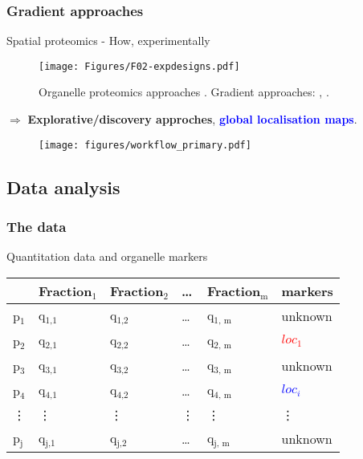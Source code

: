 \subsubsection*{Gradient approaches}
\label{sec:grad}

\begin{frame}{Spatial proteomics - How, experimentally}
  \begin{figure}
    \texttt{[image: Figures/F02-expdesigns.pdf]}
    \caption{Organelle proteomics approaches
      \citep{Gatto:2010}. Gradient approaches: \cite{Dunkley:2006},
      \cite{Foster2006}.}
  \end{figure}
  $\Rightarrow$ \textbf{Explorative/discovery approches},
  \textcolor{Blue}{\textbf{global localisation maps}}.
\end{frame}


\begin{frame}{}
  \begin{figure}
    \texttt{[image: figures/workflow\_primary.pdf]}
  \end{figure} 
\end{frame}

\subsection*{Data analysis}
\label{sec:comp}

\subsubsection*{The data}
\label{sec:data}
 
\begin{frame}{Quantitation data and organelle markers}
  \begin{center}
    \begin{tabular}{|l|llll||l|}
      \hline
      & Fraction$_{\text{1}}$ & Fraction$_{\text{2}}$ & \ldots{} & Fraction$_{\text{m}}$ & markers\\
      \hline
      p$_{\text{1}}$ & q$_{\text{1,1}}$ & q$_{\text{1,2}}$ & \ldots{} & q$_{\text{1, m}}$ & unknown \\
      p$_{\text{2}}$ & q$_{\text{2,1}}$ & q$_{\text{2,2}}$ & \ldots{} & q$_{\text{2, m}}$ & \textcolor{Red}{$loc_{1}$}\\
      p$_{\text{3}}$ & q$_{\text{3,1}}$ & q$_{\text{3,2}}$ & \ldots{} & q$_{\text{3, m}}$ & unknown \\
      p$_{\text{4}}$ & q$_{\text{4,1}}$ & q$_{\text{4,2}}$ & \ldots{} & q$_{\text{4, m}}$ & \textcolor{Blue}{$loc_{i}$}\\
      \vdots & \vdots & \vdots & \vdots & \vdots & \vdots\\
      p$_{\text{j}}$ & q$_{\text{j,1}}$ & q$_{\text{j,2}}$ & \ldots{} & q$_{\text{j, m}}$ & unknown \\
      \hline
    \end{tabular}
  \end{center}
\end{frame}

